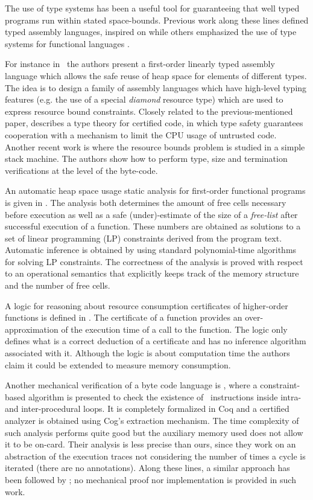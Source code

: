 The use of type systems has been a useful tool for guaranteeing that well typed programs run within stated space-bounds.
 Previous work along these lines defined typed assembly languages, inspired on \cite{MWCG99tal} while others emphasized the use of type systems for functional languages \cite{AH02ats,Hofmann00tsb,HP99rdd}. 


For instance in~\cite{AC03hba} the authors present a first-order linearly typed assembly language which allows the safe reuse of heap space for elements of different types. The idea is to design a family of assembly languages which have high-level typing features (e.g. the use of a special {\em diamond} resource type) which are used to express resource bound constraints. Closely related to the previous-mentioned paper, \cite{VC04fta} describes a type theory for certified code, in which type safety guarantees cooperation with a mechanism to limit the CPU usage of untrusted code. Another recent work is \cite{ACDJ04fsb} where the resource bounds problem is studied in a simple stack machine. The authors show how to perform type, size and termination verifications at the level of the byte-code.

An automatic heap space usage static analysis for first-order functional programs is given in \cite{HJ03sph}. The analysis both determines the amount of free cells necessary before execution as well as a safe (under)-estimate of the size of a \emph{free-list} after successful execution of a
function.  These numbers are obtained as solutions to a set of linear
programming (LP) constraints derived from the program text. Automatic
inference is obtained by using standard polynomial-time algorithms for
solving LP constraints. The correctness of the analysis is proved
with respect to an operational semantics that explicitly keeps track of
the memory structure and the number of free cells.

A logic for reasoning
about resource consumption certificates of higher-order functions is defined in \cite{CW00rbc}. The
certificate of a function provides an over-approximation of the
execution time of a call to the function. The logic only defines what 
is a correct deduction of a certificate and has no inference
algorithm associated with it. Although the logic is about computation time the authors claim it could be extended to measure memory consumption. 

Another mechanical verification of a byte code language is \cite{CJPS05cmu}, where a constraint-based algorithm is presented to check the existence of \new\ instructions inside intra- and inter-procedural loops. It is completely formalized in Coq and a certified analyzer is obtained using Cog's extraction mechanism. The time complexity of such analysis performs quite good but the auxiliary memory used does not allow it to be on-card. Their analysis is less precise than ours, since they work on an abstraction of the execution traces not considering the number of times a cycle is iterated (there are no annotations). Along these lines, a similar approach has been followed by \cite{schneider04cba}; no mechanical proof nor implementation is provided in such work.

